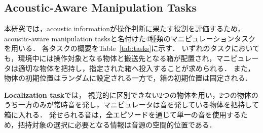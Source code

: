 \documentclass{article}
\begin{document}




\subsection{Acoustic-Aware Manipulation Tasks}
\label{sec:tasks}
本研究では，acoustic informationが操作判断に果たす役割を評価するため，acoustic-aware manipulation tasksと名付けた4種類のマニピュレーションタスクを用いる．
各タスクの概要をTable~\ref{tab:tasks}に示す．
いずれのタスクにおいても，環境中には操作対象となる物体と搬送先となる箱が配置され，マニピュレータは適切な物体を把持し，指定された箱へ投入することが求められる．
また，物体の初期位置はランダムに設定される一方で，箱の初期位置は固定される．

\textbf{Localization task}では，
視覚的に区別できない2つの物体を用い，2つの物体のうち一方のみが常時音を発し，マニピュレータは音を発している物体を把持して箱に入れる．
発せられる音は，全エピソードを通じて単一の音を使用するため，把持対象の選択に必要となる情報は音源の空間的位置である．
\end{document}
